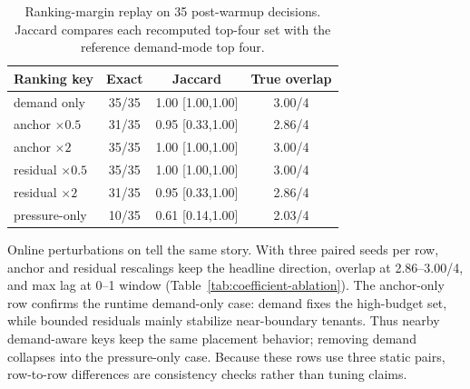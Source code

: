 \begin{table}[!t]
  \centering
  \caption{Ranking-margin replay on 35 post-warmup decisions. Jaccard compares
  each recomputed top-four set with the reference demand-mode top four.}
  \label{tab:ranking-margin}
  \small
  \setlength{\tabcolsep}{3.2pt}
  \begin{tabular}{lccc}
    \toprule
    Ranking key & Exact & Jaccard & True overlap \\
    \midrule
    demand only & 35/35 & 1.00 [1.00,1.00] & 3.00/4 \\
    anchor $\times 0.5$ & 31/35 & 0.95 [0.33,1.00] & 2.86/4 \\
    anchor $\times 2$ & 35/35 & 1.00 [1.00,1.00] & 3.00/4 \\
    residual $\times 0.5$ & 35/35 & 1.00 [1.00,1.00] & 3.00/4 \\
    residual $\times 2$ & 31/35 & 0.95 [0.33,1.00] & 2.86/4 \\
    pressure-only & 10/35 & 0.61 [0.14,1.00] & 2.03/4 \\
    \bottomrule
  \end{tabular}
\end{table}

Online perturbations on \runtimedrift tell the same story. With three paired
seeds per row, anchor and residual rescalings keep the headline direction,
overlap at 2.86--3.00/4, and max lag at 0--1 window
(Table~\ref{tab:coefficient-ablation}). The anchor-only row confirms the
runtime demand-only case: demand fixes the high-budget set, while bounded
residuals mainly stabilize near-boundary tenants. Thus nearby demand-aware
keys keep the same placement behavior; removing demand collapses into the
pressure-only case. Because these rows use three static pairs, row-to-row
differences are consistency checks rather than tuning claims.

